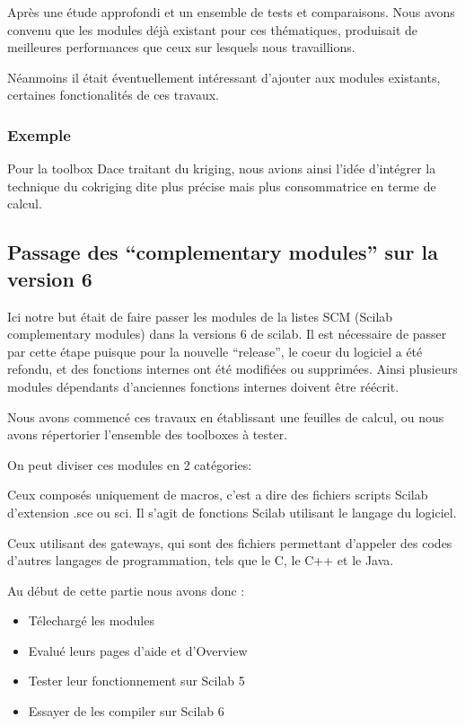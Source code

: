 Après une étude approfondi et un ensemble de tests et comparaisons.
Nous avons convenu que les modules déjà existant pour ces thématiques,
produisait de meilleures performances que ceux sur lesquels nous travaillions.

Néanmoins il était éventuellement intéressant d’ajouter aux modules existants,
certaines fonctionalités de ces travaux.

\subsubsection*{Exemple}
Pour la toolbox Dace traitant du kriging, nous avions ainsi l’idée d'intégrer
la technique du cokriging dite plus précise mais plus consommatrice en terme de calcul.

\subsection*{Passage des ``complementary modules'' sur la version 6}

Ici notre but était de faire passer les modules de la listes SCM (Scilab complementary modules) dans la versions 6 de scilab. Il est nécessaire de passer par cette étape puisque pour la nouvelle “release”, le coeur du logiciel a été refondu, et des fonctions internes ont été modifiées ou supprimées. Ainsi plusieurs modules dépendants d’anciennes fonctions internes doivent être réécrit.

Nous avons commencé ces travaux en établissant une feuilles de calcul, ou nous avons répertorier l’ensemble des toolboxes à tester.

On peut diviser ces modules en 2 catégories:

Ceux composés uniquement de macros, c’est a dire des fichiers scripts Scilab d’extension .sce ou sci. Il s’agit de fonctions Scilab utilisant le langage du logiciel.

Ceux utilisant des gateways, qui sont des fichiers permettant d’appeler des codes d’autres langages de programmation, tels que le C, le C++ et le Java.

Au début de cette partie nous avons donc :

\begin{itemize}
\item Télechargé les modules
\item Evalué leurs pages d’aide et d’Overview
\item Tester leur fonctionnement sur Scilab 5
\item Essayer de les compiler sur Scilab 6
\end{itemize}

